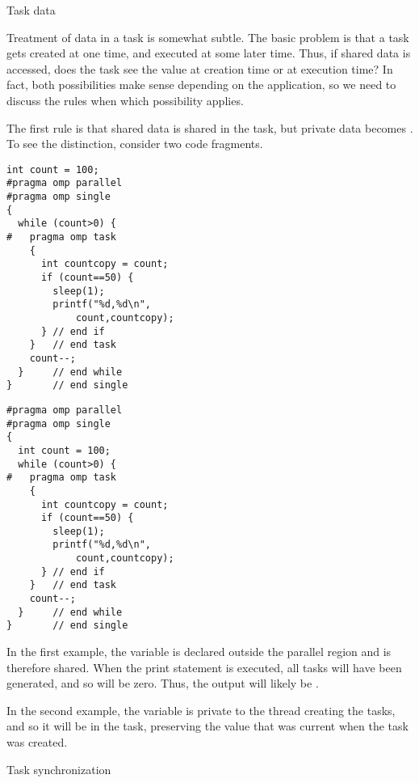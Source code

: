  {Task data}

Treatment of data in a task is somewhat subtle. The basic problem is
that a task gets created at one time, and executed at some later time.
Thus,
if shared data is accessed, does the task see the value at creation
time or at execution time? In fact, both possibilities make sense
depending on the application, so we need to discuss the rules when
which possibility applies.

The first rule is that shared data is shared in the task, but private
data becomes . To see the distinction, consider two
code fragments.

\begin{multicols}{2}
\begin{lstlisting}
int count = 100;
#pragma omp parallel
#pragma omp single
{
  while (count>0) {
#   pragma omp task
    {
      int countcopy = count;
      if (count==50) {
        sleep(1);
        printf("%d,%d\n",
            count,countcopy);
      } // end if
    }   // end task
    count--;
  }     // end while
}       // end single
\end{lstlisting}

\columnbreak

\begin{lstlisting}
#pragma omp parallel
#pragma omp single
{
  int count = 100;
  while (count>0) {
#   pragma omp task
    {
      int countcopy = count;
      if (count==50) {
        sleep(1);
        printf("%d,%d\n",
            count,countcopy);
      } // end if
    }   // end task
    count--;
  }     // end while
}       // end single
\end{lstlisting}

\end{multicols}

In the first example,
the variable  is declared outside the
parallel region and is therefore shared. When the print statement is
executed, all tasks will have been generated, and so  will be
zero. Thus, the output will likely be .

In the second example,
the  variable is private to the thread creating the tasks,
and so it will be  in the task, preserving the value
that was current when the task was created.


 {Task synchronization}

